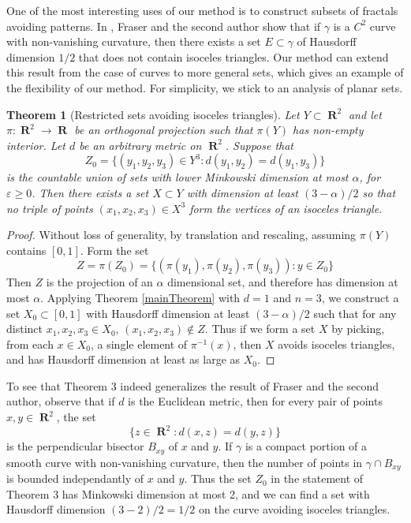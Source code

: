 \documentclass[dvipsnames,letterpaper,12pt]{article}
\numberwithin{equation}{section}
\theoremstyle{plain}
\newtheorem{theorem}{Theorem}
\DeclareMathOperator{\RR}{\mathbf{R}}
\begin{document}
One of the most interesting uses of our method is to construct subsets of fractals avoiding patterns. In \cite{MalabikaRob}, Fraser and the second author show that if $\gamma$ is a $C^2$ curve with non-vanishing curvature, then there exists a set $E \subset \gamma$ of Hausdorff dimension $1/2$ that does not contain isoceles triangles. Our method can extend this result from the case of curves to more general sets, which gives an example of the flexibility of our method. For simplicity, we stick to an analysis of planar sets.

\begin{theorem}[Restricted sets avoiding isoceles triangles]
	Let $Y \subset \RR^2$ and let $\pi: \RR^2 \to \RR$ be an orthogonal projection such that $\pi(Y)$ has non-empty interior. Let $d$ be an arbitrary metric on $\RR^2$. Suppose that
	\[ Z_0 = \{ (y_1, y_2, y_3) \in Y^3: d(y_1,y_2) = d(y_1,y_3) \} \]
	is the countable union of sets with lower Minkowski dimension at most $\alpha$, for $\varepsilon \geq 0$. Then there exists a set $X \subset Y$ with dimension at least $(3 - \alpha)/2$ so that no triple of points $(x_1, x_2, x_3) \in X^3$ form the vertices of an isoceles triangle.
\end{theorem}
\begin{proof}
	Without loss of generality, by translation and rescaling, assuming $\pi(Y)$ contains $[0,1]$. Form the set
	\[ Z = \pi(Z_0) = \{ (\pi(y_1), \pi(y_2), \pi(y_3)) : y \in Z_0 \} \]
	Then $Z$ is the projection of an $\alpha$ dimensional set, and therefore has dimension at most $\alpha$. Applying Theorem \ref{mainTheorem} with $d = 1$ and $n = 3$, we construct a set $X_0 \subset [0,1]$ with Hausdorff dimension at least $(3 - \alpha)/2$ such that for any distinct $x_1,x_2,x_3 \in X_0$, $(x_1,x_2,x_3) \not \in Z$. Thus if we form a set $X$ by picking, from each $x \in X_0$, a single element of $\pi^{-1}(x)$, then $X$ avoids isoceles triangles, and has Hausdorff dimension at least as large as $X_0$.
\end{proof}

To see that Theorem 3 indeed generalizes the result of Fraser and the second author, observe that if $d$ is the Euclidean metric, then for every pair of points $x,y \in \RR^2$, the set
%
\[ \{ z \in \RR^2: d(x,z) = d(y,z) \} \]
%
is the perpendicular bisector $B_{xy}$ of $x$ and $y$. If $\gamma$ is a compact portion of a smooth curve with non-vanishing curvature, then the number of points in $\gamma \cap B_{xy}$ is bounded independantly of $x$ and $y$. Thus the set $Z_0$ in the statement of Theorem 3 has Minkowski dimension at most 2, and we can find a set with Hausdorff dimension $(3 - 2)/2 = 1/2$ on the curve avoiding isoceles triangles.
\end{document}
